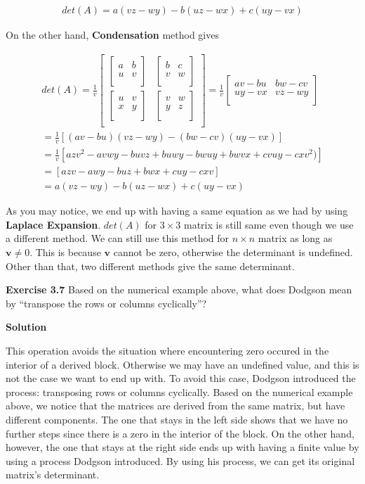 \documentclass[12pt]{article}
\newcommand{\matxx}[2] {
\begin{bmatrix}
  #1 \\
  #2 \\
\end{bmatrix}
}
\begin{document}
\[
\begin{split}
  det(A)
  = a(vz-wy) - b(uz-wx) + c(uy-vx)
\end{split}
\]

On the other hand, \textbf{Condensation} method gives

\[
  \begin{split}
    det(A)
    =
    \frac{1}{v}
    \matxx
    {
      \matxx{a & b}{u & v} &
      \matxx{b & c}{v & w}
    }
    {
      \matxx{u & v}{x & y} &
      \matxx{v & w}{y & z}
    }
    =
    \frac{1}{v}
    \matxx
    {
      av - bu &
      bw - cv
    }
    {
      uy-vx &
      vz - wy
    } \\
    = \frac{1}{v}\left[(av-bu)(vz-wy) - (bw-cv)(uy-vx)\right] \\
    = \frac{1}{v}\left[azv^2 - avwy - buvz + buwy - bwuy + bwvx + cvuy - cxv^2)\right] \\
    = \left[azv - awy - buz + bwx + cuy - cxv \right] \\
    = a(vz-wy) - b(uz-wx) + c(uy-vx)
  \end{split}
\]

As you may notice, we end up with having a same equation as we had by using \textbf{Laplace Expansion}. \(det(A)\) for \(3 \times 3\) matrix is still same even though we use a different method.
We can still use this method for \(n \times n\) matrix as long as \(\mathbf{v} \neq 0\).
This is because \(\mathbf{v}\) cannot be zero, otherwise the determinant is undefined.
Other than that, two different methods give the same determinant.

\bigskip

\textbf{Exercise 3.7} Based on the numerical example above, what does Dodgson mean by “transpose the rows or columns cyclically”?

\bigskip

\textbf{Solution}

This operation avoids the situation where encountering zero occured in the interior of a derived block.
Otherwise we may have an undefined value, and this is not the case we want to end up with.
To avoid this case, Dodgson introduced the process: transposing rows or columns cyclically.
Based on the numerical example above, we notice that the matrices are derived from the same matrix, but have different components. The one that stays in the left side shows that we have no further steps since there is a zero in the interior of the block.
On the other hand, however, the one that stays at the right side ends up with having a finite value by using a process Dodgson introduced.
By using his process, we can get its original matrix's determinant.
\end{document}
